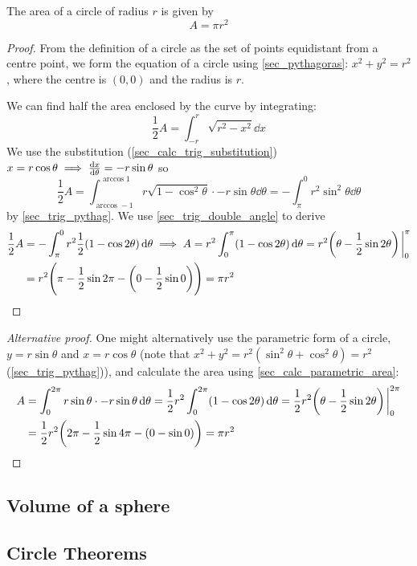 \begin{theorem}
The area of a circle of radius \(r\) is given by
\begin{equation*}
A = \pi r^2
\end{equation*}
\end{theorem}
\begin{proof}
From the definition of a circle as the set of points equidistant from a
centre point, we form the equation of a circle using \ref{sec_pythagoras}:
\(x^2 + y^2 = r^2\), where the centre is \((0, 0)\) and the radius is \(r\).

We can find half the area enclosed by the curve by integrating:
\begin{equation*}
\frac 12 A = \int_{-r}^r \sqrt{r^2 - x^2} \dd{x}
\end{equation*}
We use the substitution (\ref{sec_calc_trig_substitution})
\(x = r \cos \theta \implies \dv{x}{\theta} = -r \sin \theta\) so
\begin{equation*}
\frac 12 A = \int_{\arccos -1}^{\arccos 1}
    r\sqrt{1 - \cos^2 \theta} \cdot -r \sin \theta \dd{\theta}
  = -\int_\pi^0 r^2 \sin^2 \theta \dd{\theta}
\end{equation*}
by \ref{sec_trig_pythag}. We use \ref{sec_trig_double_angle} to derive
\begin{align*}
\frac 12 A &= -\int_\pi^0
    r^2 \frac 12 (1 - \cos 2 \theta) \dd{\theta} \implies
 A = r^2 \int_0^\pi (1 - \cos 2 \theta) \dd{\theta} =
 r^2\pqty{\theta - \frac 12 \sin 2 \theta}\eval_0^\pi \\
 &= r^2 \pqty{\pi - \frac 12 \sin 2 \pi -
               \pqty{0 - \frac 12 \sin 0}} = \pi r^2 \qedhere
\end{align*}
\end{proof}
\begin{proof}[Alternative proof]
One might alternatively use the parametric form of a circle,
\(y = r \sin \theta\) and \(x = r \cos \theta\)
(note that \(x^2 + y^2 = r^2(\sin^2 \theta + \cos^2 \theta) = r^2\)
(\ref{sec_trig_pythag})), and calculate the area using
\ref{sec_calc_parametric_area}:
\begin{align*}
A &= \int_0^{2\pi}
    r \sin \theta \cdot -r \sin \theta \dd{\theta} =
 \frac 12 r^2 \int_0^{2\pi} (1 - \cos 2 \theta) \dd{\theta} =
 \frac 12 r^2 \pqty{\theta - \frac 12 \sin 2 \theta}\eval_0^{2\pi} \\
 &= \frac 12 r^2 \pqty{2\pi - \frac 12 \sin 4 \pi -
                  \pqty{0 - \sin 0}} = \pi r^2 \qedhere
\end{align*}
\end{proof}

\subsection{Volume of a sphere}

\subsection{Circle Theorems}
